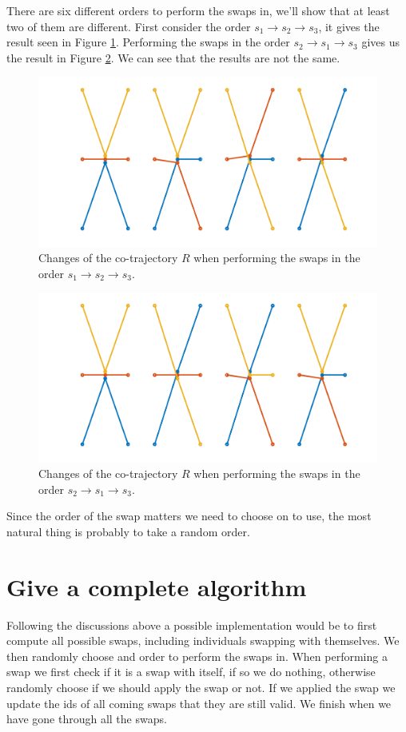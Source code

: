 \documentclass[11pt]{article}
\begin{document}
There are six different orders to perform the swaps in, we'll show
that at least two of them are different. First consider the order
\(s_1 \to s_2 \to s_3\), it gives the result seen in Figure
\ref{fig:orga235c8f}. Performing the swaps in the order \(s_2 \to s_1 \to
s_3\) gives us the result in Figure \ref{fig:orgae8e0e5}. We can see that
the results are not the same.
\begin{figure}[htbp]
\centering
\includegraphics[width=.9\linewidth]{figures/swap-order-1.pdf}
\caption{\label{fig:orga235c8f}
Changes of the co-trajectory \(R\) when performing the swaps in the order \(s_1 \to s_2 \to s_3\).}
\end{figure}

\begin{figure}[htbp]
\centering
\includegraphics[width=.9\linewidth]{figures/swap-order-2.pdf}
\caption{\label{fig:orgae8e0e5}
Changes of the co-trajectory \(R\) when performing the swaps in the order \(s_2 \to s_1 \to s_3\).}
\end{figure}

Since the order of the swap matters we need to choose on to use, the
most natural thing is probably to take a random order.
\section{Give a complete algorithm}
\label{sec:org6f941d9}
Following the discussions above a possible implementation would be to
first compute all possible swaps, including individuals swapping with
themselves. We then randomly choose and order to perform the swaps in.
When performing a swap we first check if it is a swap with itself, if
so we do nothing, otherwise randomly choose if we should apply the
swap or not. If we applied the swap we update the ids of all coming
swaps that they are still valid. We finish when we have gone through
all the swaps.
\end{document}
